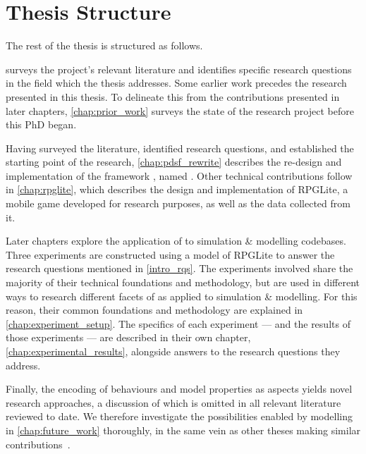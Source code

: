 \section{Thesis Structure}
\label{intro_thesis_structure}

The rest of the thesis is structured as follows.

 surveys the project's relevant literature and identifies
specific research questions in the field which the thesis addresses. Some
earlier work precedes the research presented in this thesis. To delineate this
from the contributions presented in later chapters, \cref{chap:prior_work}
surveys the state of the research project before this PhD began.

Having surveyed the literature, identified research questions, and established
the starting point of the research, \cref{chap:pdsf_rewrite} describes the
re-design and implementation of the \aop{} framework \pydysofu{}, named
\pdsfthree. Other technical contributions follow in \cref{chap:rpglite}, which
describes the design and implementation of RPGLite, a mobile game developed for
research purposes, as well as the data collected from it.

Later chapters explore the application of \aop{} to simulation \& modelling
codebases. Three experiments are constructed using a model of RPGLite to answer
the research questions mentioned in \cref{intro_rqs}. The experiments involved
share the majority of their technical foundations and methodology, but are used
in different ways to research different facets of \aop{} as applied to
simulation \& modelling. For this reason, their common foundations and
methodology are explained in \cref{chap:experiment_setup}. The specifics of each
experiment --- and the results of those experiments --- are described in their
own chapter, \cref{chap:experimental_results}, alongside answers to the research
questions they address.

Finally, the encoding of behaviours and model properties as aspects yields novel
research approaches, a discussion of which is omitted in all relevant literature
reviewed to date. We therefore investigate the possibilities enabled by
\aspectoriented{} modelling in \cref{chap:future_work} thoroughly, in the same
vein as other theses making similar contributions~\cite{marsh1994formalising}.







